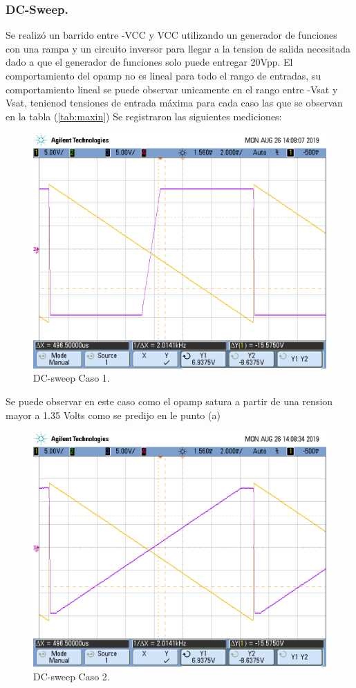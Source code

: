 \subsubsection{DC-Sweep.}
Se realizó un barrido entre -VCC y VCC utilizando un generador de funciones con una rampa y un circuito inversor para llegar a la tension de salida necesitada dado a que el generador de funciones solo puede entregar 20Vpp.
El comportamiento del opamp no es lineal para todo el rango de entradas, su comportamiento lineal se puede observar unicamente en el rango entre -Vsat y Vsat, tenienod tensiones de entrada máxima para cada caso las que se observan en la tabla (\ref{tab:maxin})
Se registraron las siguientes mediciones:
\begin{figure}[H]	
	\centering
	\includegraphics[width=\textwidth]{Ejercicio1/Imagenes/dc_sweep_c1.png}
	\caption{DC-sweep Caso 1.}
	\label{fig:dcc1}
\end{figure} 
Se puede observar en este caso como el opamp satura a partir de una rension mayor a 1.35 Volts como se predijo en le punto (a)
\begin{figure}[H]	
	\centering
	\includegraphics[width=\textwidth]{Ejercicio1/Imagenes/dc_sweep_c2.png}
	\caption{DC-sweep Caso 2.}
	\label{fig:dcc2}
\end{figure} 

